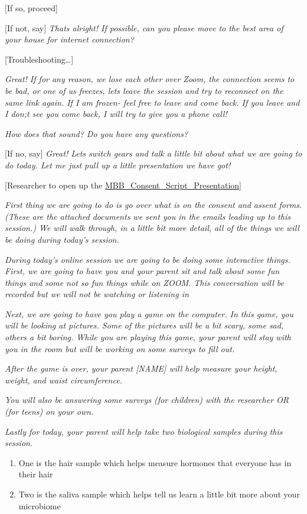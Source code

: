 \documentclass[]{book}
\providecommand{\tightlist}{%
  \setlength{\itemsep}{0pt}\setlength{\parskip}{0pt}}
\begin{document}
{[}If so, proceed{]}

{[}If not, say{]} \emph{Thats alright! If possible, can you please move to the best area of your house for internet connection?}

{[}Troubleshooting\ldots{}{]}

\emph{Great! If for any reason, we lose each other over Zoom, the connection seems to be bad, or one of us freezes, lets leave the session and try to reconnect on the same link again. If I am frozen- feel free to leave and come back. If you leave and I don;t see you come back, I will try to give you a phone call!}

\emph{How does that sound? Do you have any questions?}

{[}If no, say{]} \emph{Great! Lets switch gears and talk a little bit about what we are going to do today. Let me just pull up a little presentation we have got!}

{[}Researcher to open up the \href{https://ucla.app.box.com/file/689404174873}{MBB\_Consent\_Script\_Presentation}{]}

\emph{First thing we are going to do is go over what is on the consent and assent forms. (These are the attached documents we sent you in the emails leading up to this session.) We will walk through, in a little bit more detail, all of the things we will be doing during today's session.}

\emph{During today's online session we are going to be doing some interactive things. First, we are going to have you and your parent sit and talk about some fun things and some not so fun things while on ZOOM. This conversation will be recorded but we will not be watching or listening in}

\emph{Next, we are going to have you play a game on the computer. In this game, you will be looking at pictures. Some of the pictures will be a bit scary, some sad, others a bit boring. While you are playing this game, your parent will stay with you in the room but will be working on some surveys to fill out.}

\emph{After the game is over, your parent {[}NAME{]} will help measure your height, weight, and waist circumference.}

\emph{You will also be answering some surveys (for children) with the researcher OR (for teens) on your own.}

\emph{Lastly for today, your parent will help take two biological samples during this session.}

\begin{enumerate}
\def\labelenumi{\arabic{enumi}.}
\tightlist
\item
  One is the hair sample which helps measure hormones that everyone has in their hair
\item
  Two is the saliva sample which helps tell us learn a little bit more about your microbiome
\end{enumerate}
\end{document}
